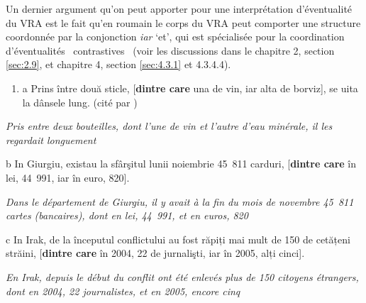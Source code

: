 Un dernier argument qu'on peut apporter pour une interprétation d'éventualité du VRA est le fait qu'en roumain le corps du VRA peut comporter une structure coordonnée par la conjonction \textit{iar} `et', qui est spécialisée pour la coordination d'éventualités {\guillemotleft}~contrastives~{\guillemotright} (voir les discussions dans le chapitre 2, section \ref{sec:2.9}, et chapitre 4, section \ref{sec:4.3.1} et 4.3.4.4).


\begin{enumerate}
\item a  Prins între două sticle, [\textbf{dintre care} una de vin, iar alta de borviz], se uita la dânsele lung. (cité par \citep[268]{Gheorghe2004})   


\end{enumerate}
{\itshape
Pris entre deux bouteilles, dont l'une de vin et l'autre d'eau minérale, il les regardait longuement}

  b  In Giurgiu, existau la sfârşitul lunii noiembrie 45~811 carduri, [\textbf{dintre care} în lei, 44~991, iar în euro, 820].

{\itshape
Dans le département de Giurgiu, il y avait à la fin du mois de novembre 45~811 cartes (bancaires), dont en lei, 44~991, et en euros, 820 } 

  c  In Irak, de la începutul conflictului au fost răpiți mai mult de 150 de cetățeni străini, [\textbf{dintre care} în 2004, 22 de jurnalişti, iar în 2005, alți cinci].

    \textit{En Irak, depuis le début du conflit ont été enlevés plus de 150 citoyens étrangers, dont en 2004, 22 journalistes, et en 2005, encore cinq}

